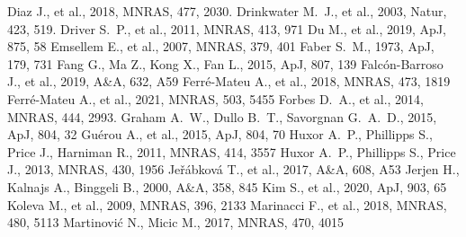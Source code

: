 \documentclass[a4paper,fleqn,usenatbib]{mnras}
\begin{document}
\begin{thebibliography}{99}
 Diaz J., et al., 2018, MNRAS, 477, 2030. 
 Drinkwater M.~J., et al., 2003, Natur, 423, 519. 
 Driver S.~P., et al., 2011, MNRAS, 413, 971 
 Du M., et al., 2019, ApJ, 875, 58
 Emsellem E., et al., 2007, MNRAS, 379, 401
 Faber S.~M., 1973, ApJ, 179, 731
 Fang G., Ma Z., Kong X., Fan L., 2015, ApJ, 807, 139
 Falc{\'o}n-Barroso J., et al., 2019, A\&A, 632, A59
 Ferr{\'e}-Mateu A., et al., 2018, MNRAS, 473, 1819
 Ferr{\'e}-Mateu A., et al., 2021, MNRAS, 503, 5455
 Forbes D.~A., et al., 2014, MNRAS, 444, 2993. 
 Graham A.~W., Dullo B.~T., Savorgnan G.~A.~D., 2015, ApJ, 804, 32
 Gu{\'e}rou A., et al., 2015, ApJ, 804, 70
 Huxor A.~P., Phillipps S., Price J., Harniman R., 2011, MNRAS, 414, 3557
 Huxor A.~P., Phillipps S., Price J., 2013, MNRAS, 430, 1956
 Je{\v{r}}{\'a}bkov{\'a} T., et al., 2017, A\&A, 608, A53
 Jerjen H., Kalnajs A., Binggeli B., 2000, A\&A, 358, 845
 Kim S., et al., 2020, ApJ, 903, 65
 Koleva M., et al., 2009, MNRAS, 396, 2133
 Marinacci F., et al., 2018, MNRAS, 480, 5113
 Martinovi{\'c} N., Micic M., 2017, MNRAS, 470, 4015

\end{thebibliography}
\end{document}
